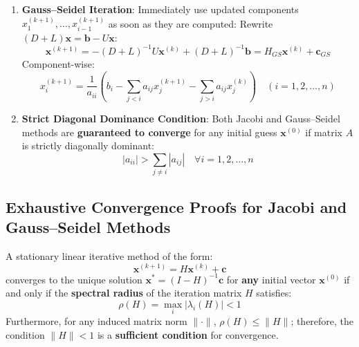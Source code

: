 \begin{theorembox}
\begin{enumerate}
    \item \textbf{Gauss--Seidel Iteration}:
    Immediately use updated components $x_1^{(k+1)}, \dots, x_{i-1}^{(k+1)}$ as soon as they are computed:
    Rewrite $(D + L)\mathbf{x} = \mathbf{b} - U\mathbf{x}$:
    \begin{equation}
        \boxed{\mathbf{x}^{(k+1)} = -(D + L)^{-1}U\mathbf{x}^{(k)} + (D + L)^{-1}\mathbf{b} = H_{GS}\mathbf{x}^{(k)} + \mathbf{c}_{GS}}
    \end{equation}
    Component-wise:
    \begin{equation}
        \boxed{x_i^{(k+1)} = \frac{1}{a_{ii}}\left( b_i - \sum_{j < i} a_{ij} x_j^{(k+1)} - \sum_{j > i} a_{ij} x_j^{(k)} \right)} \quad (i = 1, 2, \dots, n)
    \end{equation}
    \item \textbf{Strict Diagonal Dominance Condition}:
    Both Jacobi and Gauss--Seidel methods are \textbf{guaranteed to converge} for any initial guess $\mathbf{x}^{(0)}$ if matrix $A$ is strictly diagonally dominant:
    \begin{equation}
        \boxed{|a_{ii}| > \sum_{j \ne i} |a_{ij}| \quad \forall i = 1, 2, \dots, n}
    \end{equation}
\end{enumerate}
\end{theorembox}

\subsection{Exhaustive Convergence Proofs for Jacobi and Gauss--Seidel Methods}
\label{subsec:iterative_convergence_proofs}

\begin{theorembox}
A stationary linear iterative method of the form:
\begin{equation}
    \mathbf{x}^{(k+1)} = H \mathbf{x}^{(k)} + \mathbf{c}
\end{equation}
converges to the unique solution $\mathbf{x}^* = (I - H)^{-1}\mathbf{c}$ for \textbf{any} initial vector $\mathbf{x}^{(0)}$ if and only if the \textbf{spectral radius} of the iteration matrix $H$ satisfies:
\begin{equation}
    \boxed{\rho(H) = \max_i |\lambda_i(H)| < 1}
\end{equation}
Furthermore, for any induced matrix norm $\|\cdot\|$, $\rho(H) \le \|H\|$; therefore, the condition $\|H\| < 1$ is a \textbf{sufficient condition} for convergence.
\end{theorembox}

